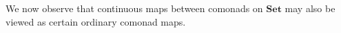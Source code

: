 \documentclass[11pt, oneside, article]{memoir}
\theoremstyle{plain}
\theoremstyle{definition}
\theoremstyle{remark}
\DeclareMathOperator{\ophelper}{op}
\DeclarePairedDelimiter{\abs}{\lvert}{\rvert}
\newcommand{\dash}{{\mathord{\text{--}}}}
\newcommand{\op}{^{\ophelper}}
\newcommand{\namedcat}[1]{\mathbf{#1}}
\newcommand{\Set}{\namedcat{Set}}
\newcommand{\CAT}{\namedcat{CAT}}
\newcommand{\clift}[1]{\overline{#1}}
\newcommand{\pts}[1]{{\abs{#1}}}
\newcommand{\one}[1]{\pts{#1}}
\newcommand{\reindex}[1]{\Delta_{#1}}
\newcommand{\cmnd}[1]{{#1}}
\newcommand{\xX}{X}
\newcommand{\xY}{Y}
\newcommand{\cC}{\cmnd{C}}
\newcommand{\cD}{\cmnd{D}}
\newcommand{\coto}{\to}
\begin{document}



We now observe that continuous maps between comonads on $\Set$ may
also be viewed as certain ordinary comonad maps.

\end{document}
